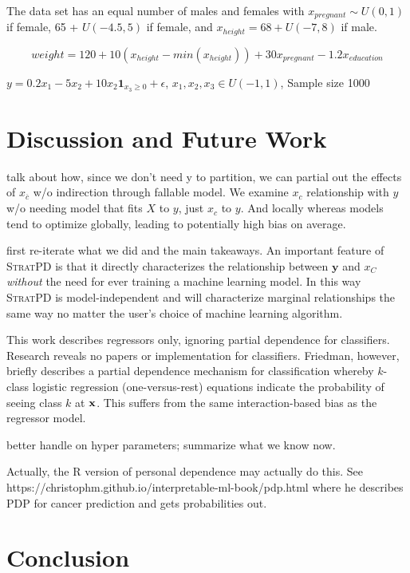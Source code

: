 \documentclass[12pt]{article}
\newcommand{\spd}{\fontfamily{cmr}\textsc{\small StratPD}}
\newcommand{\xnc}{$x_{\overline{c}}$}
\begin{document}
{The data set has an equal number of males and females with $x_{pregnant} \sim U(0,1)$ if female, 65 + $U(-4.5,5)$ if female, and $x_{height} = 68 + U(-7,8)$ if male. 

\[
weight = 120 + 10(x_{height} - min(x_{height})) + 30x_{pregnant} - 1.2x_{education}
\]

$y = 0.2x_1 - 5x_2 + 10x_2\mathbf{1}_{x_3 \geq 0} + \epsilon$, $x_1, x_2, x_3 \in U(-1,1)$, Sample size 1000


\section{Discussion and Future Work}

talk about how, since we don't need y to partition, we can partial out the effects of \xnc{} w/o indirection through fallable model.  We examine $x_c$ relationship with $y$ w/o needing model that fits $X$ to $y$, just $x_c$ to $y$. And locally whereas models tend to optimize globally, leading to potentially high bias on average.

{\color{red} first re-iterate what we did and the main takeaways}. An important feature of \spd{} is that it directly characterizes the relationship between $\mathbf{y}$ and $x_C$ \emph{without} the need for ever training a machine learning model. In this way \spd{} is {model-independent} and will characterize marginal relationships the same way no matter the user's choice of machine learning algorithm. 

This work describes regressors only, ignoring partial dependence for classifiers.  Research reveals no papers or implementation for classifiers. Friedman, however, briefly describes a partial dependence mechanism for classification whereby $k$-class logistic regression (one-versus-rest) equations indicate the probability of seeing class $k$ at $\bf{x}$.  This suffers from the same interaction-based bias as the regressor model.



better handle on hyper parameters; summarize what we know now.

Actually, the R version of personal dependence may actually do this. See https://christophm.github.io/interpretable-ml-book/pdp.html where he describes PDP for cancer prediction and gets probabilities out.

\section{Conclusion}
\label{sec:conc}

}
\end{document}
